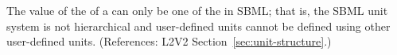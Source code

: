 The value of the   of a \Unit can only be
one of the  in SBML; that is, the SBML unit
system is not hierarchical and user-defined units cannot be defined using
other user-defined units.  (References: L2V2
Section~\ref{sec:unit-structure}.)

